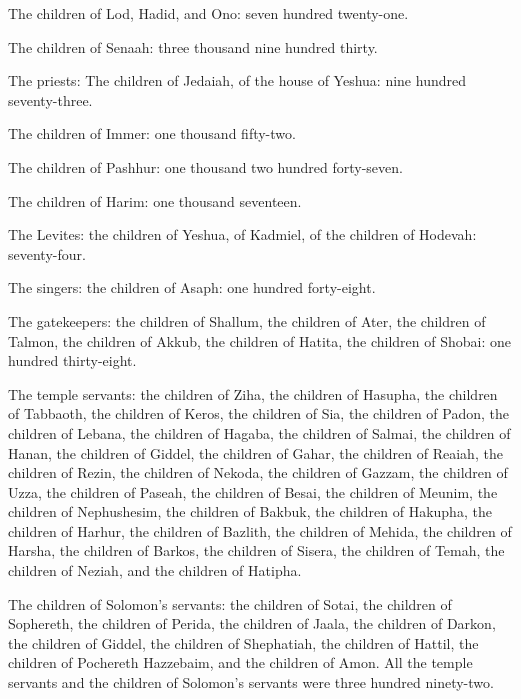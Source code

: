 \myverse{}The children of Lod, Hadid, and Ono: seven hundred
twenty-one.

\myverse{}The children of Senaah: three thousand nine hundred
thirty.


\vspace{\baselineskip} \myverse{}The priests: The children of Jedaiah, of the house
of Yeshua: nine hundred seventy-three.

\myverse{}The children of Immer: one thousand fifty-two.

\myverse{}The children of Pashhur: one thousand two hundred
forty-seven.

\myverse{}The children of Harim: one thousand seventeen.


\vspace{\baselineskip} \myverse{}The Levites: the children of Yeshua, of Kadmiel, of
the children of Hodevah: seventy-four.

\myverse{}The singers: the children of Asaph: one hundred forty-eight.

\myverse{}The gatekeepers: the children of Shallum, the children
of Ater, the children of Talmon, the children of Akkub, the children of Hatita, the children of Shobai:
one hundred thirty-eight.

\myverse{}The temple servants: the children of Ziha, the children of Hasupha,
the children of Tabbaoth,
\myverse{}the children of Keros, the children of Sia, the children of Padon,
\myverse{}the children of Lebana, the children of Hagaba, the children of Salmai,
\myverse{}the children of Hanan, the children of Giddel, the children of Gahar,
\myverse{}the children of Reaiah, the children of Rezin, the children of Nekoda,
\myverse{}the children of Gazzam, the children of Uzza, the children of Paseah,
\myverse{}the children of Besai, the children of Meunim, the children of Nephushesim,
\myverse{}the children of Bakbuk, the children of Hakupha, the children of Harhur,
\myverse{}the children of Bazlith, the children of Mehida, the children of Harsha,
\myverse{}the children of Barkos, the children of Sisera, the children of Temah,
\myverse{}the children of Neziah, and the children of Hatipha.

\myverse{}The children of Solomon’s servants: the children of Sotai, the
children of Sophereth, the children of Perida,
\myverse{}the children of Jaala, the children of Darkon, the children of Giddel,
\myverse{}the children of Shephatiah, the children of Hattil, the children of Pochereth
Hazzebaim, and the children of Amon.
\myverse{}All the temple servants and the children of Solomon’s servants were three
hundred ninety-two.

